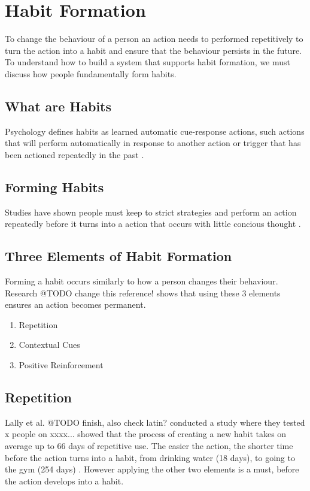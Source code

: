 \newpage

\section{Habit Formation}
To change the behaviour of a person an action needs to performed repetitively to turn the action into a habit and ensure that the behaviour persists in the future.\newline
To understand how to build a system that supports habit formation, we must discuss how people fundamentally form habits.

\subsection{What are Habits}
Psychology defines habits as learned automatic cue-response actions, such actions that will perform automatically in response to another action or trigger that has been actioned repeatedly in the past \cite{article_the_habitual_consumer}.

\subsection{Forming Habits}
Studies have shown people must keep to strict strategies and perform an action repeatedly before it turns into a action that occurs with little concious thought \cite{article_promoting_habit_formation}.

\subsection{Three Elements of Habit Formation}
Forming a habit occurs similarly to how a person changes their behaviour. Research @TODO change this reference! \cite{article_beyond_self_tracking_designing_apps} shows that using these 3 elements ensures an action becomes permanent.

\begin{enumerate}
  \item Repetition
  \item Contextual Cues
  \item Positive Reinforcement
\end{enumerate}

\subsection*{Repetition}
Lally et al. @TODO finish, also check latin? \cite{article_how_habits_formed_modelling_habit_formation} conducted a study where they tested x people on xxxx... showed that the process of creating a new habit takes on average up to 66 days of repetitive use. The easier the action, the shorter time before the action turns into a habit, from drinking water (18 days), to going to the gym (254 days) \cite{article_how_habits_formed_modelling_habit_formation}. However applying the other two elements is a must, before the action develops into a habit.

